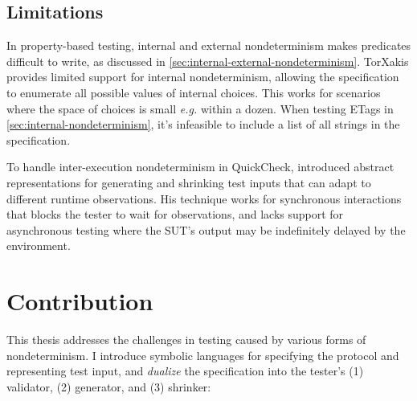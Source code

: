 \subsection{Limitations}
In property-based testing, internal and external nondeterminism makes predicates
difficult to write, as discussed
in \autoref{sec:internal-external-nondeterminism}.  TorXakis provides limited
support for internal nondeterminism, allowing the specification to enumerate all
possible values of internal choices.  This works for scenarios where the space
of choices is small {\it e.g.} within a dozen.  When testing ETags
in \autoref{sec:internal-nondeterminism}, it's infeasible to include a list of
all strings in the specification.

To handle inter-execution nondeterminism in QuickCheck, \citet{Hughes2016}
introduced abstract representations for generating and shrinking test inputs
that can adapt to different runtime observations.  His technique works for
synchronous interactions that blocks the tester to wait for observations, and
lacks support for asynchronous testing where the SUT's output may be
indefinitely delayed by the environment.

\section{Contribution}
\label{sec:contribution}
This thesis addresses the challenges in testing caused by various forms of
nondeterminism.  I introduce symbolic languages for specifying the protocol and
representing test input, and {\em dualize} the specification into the tester's
(1) validator, (2) generator, and (3) shrinker:

